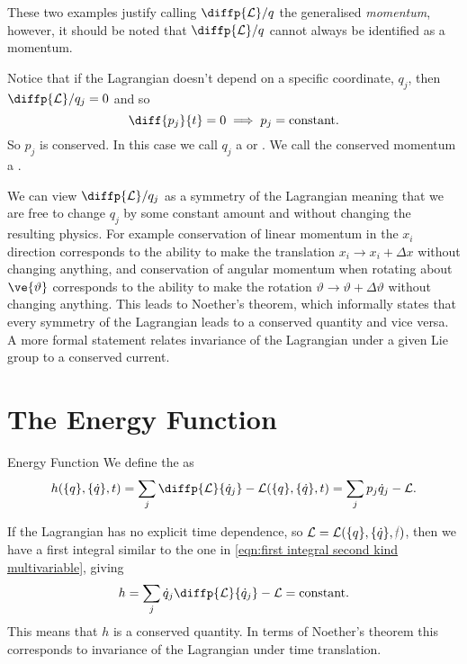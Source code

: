 \documentclass[fleqn]{NotesClass}
\newcommand*{\nodependence}[1]{\textcolor{gray}{\cancel{#1}}}
\newcommand*{\lagrangian}{\mathcal{L}}
\begin{document}
    These two examples justify calling \(\diffp{\lagrangian}/{q}\) the generalised \emph{momentum}, however, it should be noted that \(\diffp{\lagrangian}/{q}\) cannot always be identified as a momentum.
    
    Notice that if the Lagrangian doesn't depend on a specific coordinate, \(q_j\), then \(\diffp{\lagrangian}/{q_j} = 0\) and so
    \begin{equation}
        \diff{p_j}{t} = 0 \implies p_j = \mathrm{constant}.
    \end{equation}
    So \(p_j\) is conserved.
    In this case we call \(q_j\) a  or .
    We call the conserved momentum a .
    
    We can view \(\diffp{\lagrangian}/{q_j}\) as a symmetry of the Lagrangian meaning that we are free to change \(q_j\) by some constant amount and without changing the resulting physics.
    For example conservation of linear momentum in the \(x_i\) direction corresponds to the ability to make the translation \(x_i \to x_i + \Delta x\) without changing anything, and conservation of angular momentum when rotating about \(\ve{\vartheta}\) corresponds to the ability to make the rotation \(\vartheta \to \vartheta + \Delta \vartheta\) without changing anything.
    This leads to Noether's theorem, which informally states that every symmetry of the Lagrangian leads to a conserved quantity and vice versa.
    A more formal statement relates invariance of the Lagrangian under a given Lie group to a conserved current.
    
    \section{The Energy Function}
    \begin{dfn}{Energy Function}{}
        We define the  as
        \begin{equation}
            h(\{q\}, \{\dot{q}\}, t) = \sum_{j} \diffp{\lagrangian}{\dot{q}_j} - \lagrangian(\{q\}, \{\dot{q}\}, t) = \sum_{j} p_j\dot{q}_j - \lagrangian.
        \end{equation}
    \end{dfn}
    
    If the Lagrangian has no explicit time dependence, so \(\lagrangian = \lagrangian(\{q\}, \{\dot{q}\}, \nodependence{t})\), then we have a first integral similar to the one in \cref{eqn:first integral second kind multivariable}, giving
    \begin{equation}
        h = \sum_{j}\dot{q}_j\diffp{\lagrangian}{\dot{q}_j} - \lagrangian = \text{constant}.
    \end{equation}
    This means that \(h\) is a conserved quantity.
    In terms of Noether's theorem this corresponds to invariance of the Lagrangian under time translation.
    
\end{document}
